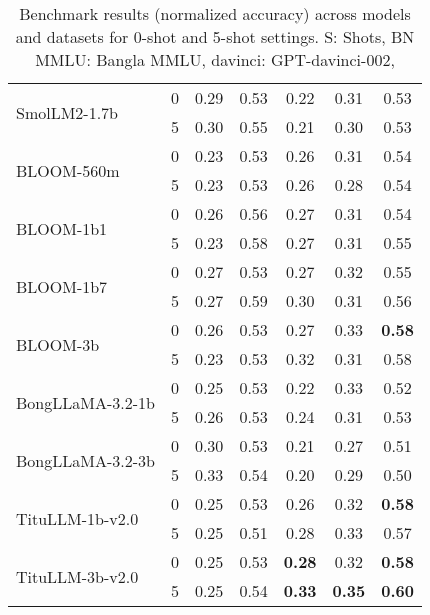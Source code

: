 \begin{table}[htb!]
{\begin{tabular}{@{}lcccccc@{}}
\multirow{2}{*}{SmolLM2-1.7b} 
 & 0 & 0.29 & 0.53 & 0.22 & 0.31 & 0.53 \\
 & 5 & 0.30 & 0.55 & 0.21 & 0.30 & 0.53 \\

 \hline

\multirow{2}{*}{BLOOM-560m} 
 & 0 & 0.23 & 0.53 & 0.26 & 0.31 & 0.54 \\
 & 5 & 0.23 & 0.53 & 0.26 & 0.28 & 0.54 \\

\multirow{2}{*}{BLOOM-1b1} 
 & 0 & 0.26 & 0.56 & 0.27 & 0.31 & 0.54 \\
 & 5 & 0.23 & 0.58 & 0.27 & 0.31 & 0.55 \\

\multirow{2}{*}{BLOOM-1b7} 
 & 0 & 0.27 & 0.53 & 0.27 & 0.32 & 0.55 \\
 & 5 & 0.27 & 0.59 & 0.30 & 0.31 & 0.56 \\

\multirow{2}{*}{BLOOM-3b} 
 & 0 & 0.26 & 0.53 & 0.27 & 0.33 & \textbf{0.58} \\
 & 5 & 0.23 & 0.53 & 0.32 & 0.31 & 0.58 \\

 \hline

\multirow{2}{*}{BongLLaMA-3.2-1b} 
 & 0 & 0.25 & 0.53 & 0.22 & 0.33 & 0.52 \\
 & 5 & 0.26 & 0.53 & 0.24 & 0.31 & 0.53 \\

\multirow{2}{*}{BongLLaMA-3.2-3b} 
 & 0 & 0.30 & 0.53 & 0.21 & 0.27 & 0.51 \\
 & 5 & 0.33 & 0.54 & 0.20 & 0.29 & 0.50 \\

 \hline

\multirow{2}{*}{TituLLM-1b-v2.0} 
 & 0 & 0.25 & 0.53 & 0.26 & 0.32 & \textbf{0.58} \\
 & 5 & 0.25 & 0.51 & 0.28 & 0.33 & 0.57 \\

\multirow{2}{*}{TituLLM-3b-v2.0} 
 & 0 & 0.25 & 0.53 & \textbf{0.28} & 0.32 & \textbf{0.58} \\
 & 5 & 0.25 & 0.54 & \textbf{0.33} & \textbf{0.35} & \textbf{0.60} \\

\bottomrule
\end{tabular}
}
\vspace{-0.2cm}
\caption{Benchmark results (normalized accuracy) across models and datasets for 0-shot and 5-shot settings. S: Shots, BN MMLU: Bangla MMLU, davinci: GPT-davinci-002, }
\label{tab:benchmark-results}
\vspace{-0.2cm}
\end{table}

